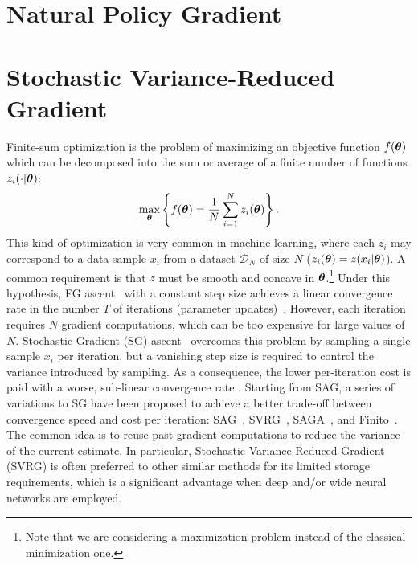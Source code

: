 \vspace{-0.05in}
\section{Natural Policy Gradient}\label{sec:npg}

\vspace{-0.05in}
\section{Stochastic Variance-Reduced Gradient}\label{sec:svrg}
\vspace{-0.05in}
Finite-sum optimization is the problem of maximizing an objective function $f(\boldsymbol{\theta})$ which can be decomposed into the sum or average of a finite number of functions $z_i(\cdot|\boldsymbol{\theta})$:
\begin{align*}
        \max_{\boldsymbol{\theta}} \left\{ f(\boldsymbol{\theta}) = \frac{1}{N}\sum_{i=1}^{N}z_i(\boldsymbol{\theta})\right\}.
\end{align*}
This kind of optimization is very common in machine learning, where each $z_i$ may correspond to a data sample $x_i$ from a dataset $\mathcal{D}_N$ of size $N$ (\ie $z_i(\boldsymbol{\theta}) = z(x_i|\boldsymbol{\theta})$). 
A common requirement is that $z$ must be smooth and concave in $\boldsymbol{\theta}$.\footnote{Note that we are considering a maximization problem instead of the classical minimization one.} 
Under this hypothesis, \acs{FG} ascent~\citep{cauchy1847methode} with a constant step size achieves a linear convergence rate in the number $T$ of iterations (\ie parameter updates)~\citep{nesterov2013introductory}.
However, each iteration requires $N$ gradient computations, which can be too expensive for large values of $N$. Stochastic Gradient (\acs{SG}) ascent~\citep[\eg][]{robbins1951stochastic,bottou2004large} overcomes this problem by sampling a single sample $x_i$ per iteration, but a vanishing step size is required to control the variance introduced by sampling. As a consequence, the lower per-iteration cost is paid with a worse, sub-linear convergence rate \cite{nemirovskii1983problem}.
Starting from \acs{SAG}, a series of variations to \acs{SG} have been proposed to achieve a better trade-off between convergence speed and cost per iteration: \eg \acs{SAG}~\citep{roux2012stochastic}, \acs{SVRG}~\cite{johnson2013accelerating}, SAGA~\cite{defazio2014saga}, and Finito~\cite{defazio2014finito}. 
The common idea is to reuse past gradient computations to reduce the variance of the current estimate.
In particular, Stochastic Variance-Reduced Gradient (\acs{SVRG}) is often preferred to other similar methods for its limited storage requirements, which is a significant advantage when deep and/or wide neural networks are employed.  

